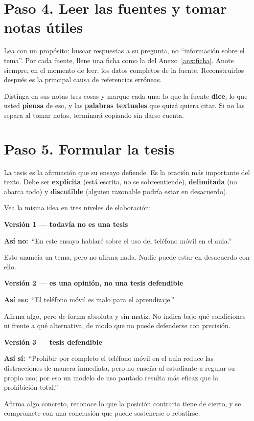 \documentclass[12pt,a4paper,openany]{report}
\newenvironment{ejemplo}[1]
	{\begin{lrbox}{\cajaguardada}\begin{minipage}{\dimexpr\textwidth-2\fboxsep\relax}\vspace{4pt}\textcolor{verdeejemplo}{\textbf{\sffamily\small #1}}\par\vspace{3pt}\small}
	{\vspace{4pt}\end{minipage}\end{lrbox}\par\vspace{4pt}\noindent\colorbox{cremaejemplo}{\usebox{\cajaguardada}}\par\vspace{8pt}}
\newcommand{\mal}{\textcolor{rojoerror}{\textbf{\sffamily\small As\'i no:}}\ }
\newcommand{\bien}{\textcolor{verdeejemplo}{\textbf{\sffamily\small As\'i s\'i:}}\ }
\begin{document}
\section{Paso 4. Leer las fuentes y tomar notas \'utiles}

Lea con un prop\'osito: buscar respuestas a su pregunta, no ``informaci\'on sobre el tema''. Por cada fuente, llene una ficha como la del Anexo~\ref{anx:ficha}. Anote siempre, en el momento de leer, los datos completos de la fuente. Reconstruirlos despu\'es es la principal causa de referencias err\'oneas.

Distinga en sus notas tres cosas y marque cada una: lo que la fuente \textbf{dice}, lo que usted \textbf{piensa} de eso, y las \textbf{palabras textuales} que quiz\'a quiera citar. Si no las separa al tomar notas, terminar\'a copiando sin darse cuenta.

\section{Paso 5. Formular la tesis}

La tesis es la afirmaci\'on que su ensayo defiende. Es la oraci\'on m\'as importante del texto. Debe ser \textbf{expl\'icita} (est\'a escrita, no se sobreentiende), \textbf{delimitada} (no abarca todo) y \textbf{discutible} (alguien razonable podr\'ia estar en desacuerdo).

Vea la misma idea en tres niveles de elaboraci\'on:

\begin{ejemplo}{Versi\'on 1 --- todav\'ia no es una tesis}
\mal ``En este ensayo hablar\'e sobre el uso del tel\'efono m\'ovil en el aula.''

Esto anuncia un tema, pero no afirma nada. Nadie puede estar en desacuerdo con ello.
\end{ejemplo}

\begin{ejemplo}{Versi\'on 2 --- es una opini\'on, no una tesis defendible}
\mal ``El tel\'efono m\'ovil es malo para el aprendizaje.''

Afirma algo, pero de forma absoluta y sin matiz. No indica bajo qu\'e condiciones ni frente a qu\'e alternativa, de modo que no puede defenderse con precisi\'on.
\end{ejemplo}

\begin{ejemplo}{Versi\'on 3 --- tesis defendible}
\bien ``Prohibir por completo el tel\'efono m\'ovil en el aula reduce las distracciones de manera inmediata, pero no ense\~na al estudiante a regular su propio uso; por eso un modelo de uso pautado resulta m\'as eficaz que la prohibici\'on total.''

Afirma algo concreto, reconoce lo que la posici\'on contraria tiene de cierto, y se compromete con una conclusi\'on que puede sostenerse o rebatirse.
\end{ejemplo}
\end{document}
